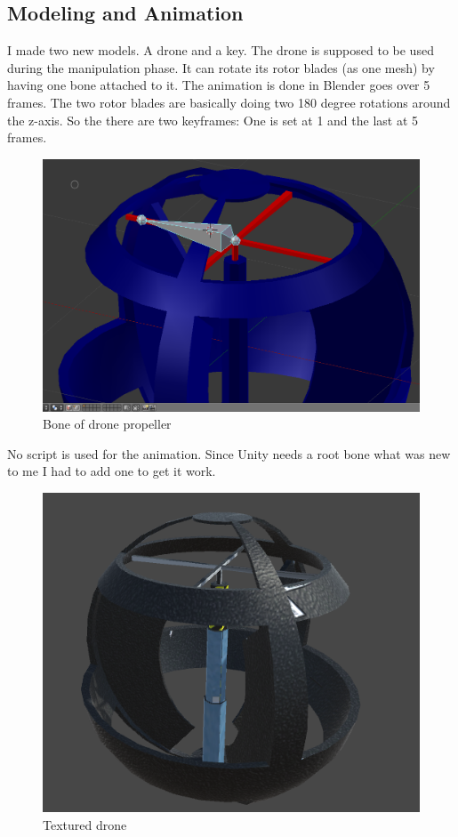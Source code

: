 \documentclass[12pt, letterpaper]{scrartcl}
\begin{document}
	\subsection{Modeling and Animation}
	I made two new models. A drone and a key. The drone is supposed to be used during the manipulation phase. It can rotate its rotor blades (as one mesh) by having one bone attached to it. The animation is done in Blender goes over 5 frames. The two rotor blades are basically doing two 180 degree rotations around the z-axis. So the there are two keyframes: One is set at 1 and the last at 5 frames.
	\begin{figure}[H]
		\centering
		\includegraphics[scale=.3]{images//alpha/droneBone}
		\caption{Bone of drone propeller}
	\end{figure}
	No script is used for the animation. Since Unity needs a root bone what was new to me I had to add one to get it work.
	\begin{figure}[H]
		\centering
		\includegraphics[scale=.6]{images//alpha/drone}
		\caption{Textured drone}
	\end{figure}
\end{document}
